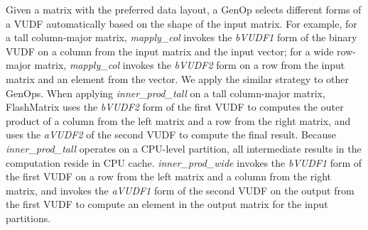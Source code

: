 Given a matrix with the preferred data layout, a GenOp selects different forms
of a VUDF automatically based on the shape of the input matrix. For example,
for a tall column-major matrix, \textit{mapply\_col} invokes the \textit{bVUDF1}
form of the binary VUDF on a column from the input matrix and the input vector;
for a wide row-major matrix, \textit{mapply\_col} invokes the \textit{bVUDF2}
form on a row from the input matrix and an element from the vector. We apply
the similar strategy to other GenOps. When applying \textit{inner\_prod\_tall}
on a tall column-major matrix, FlashMatrix uses the \textit{bVUDF2} form of
the first VUDF to computes the outer product of a column from the left matrix
and a row from the right matrix, and uses the \textit{aVUDF2} of the second VUDF
to compute the final result. Because \textit{inner\_prod\_tall} operates on
a CPU-level partition, all intermediate results in the computation reside
in CPU cache. \textit{inner\_prod\_wide} invokes the
\textit{bVUDF1} form of the first VUDF on a row from the left matrix and a column
from the right matrix, and invokes the \textit{aVUDF1} form of the second VUDF
on the output from the first VUDF to compute an element in the output matrix for
the input partitions.





